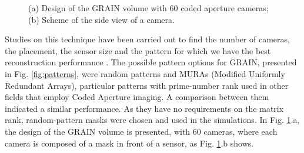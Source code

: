 \begin{figure}[ht]
    \centering
    \hfil    {}
    \caption{(a) Design of the GRAIN volume with 60 coded aperture cameras; (b) Scheme of the side view of a camera.}
    \label{fig:grainvol-sideview}
\end{figure}

Studies on this technique have been carried out to find the number of cameras, the placement, the sensor size and the pattern for which we have the best reconstruction performance \cite{tesi-cicero}. The possible pattern options for GRAIN, presented in Fig. \ref{fig:patterns}, were random patterns and MURAs (Modified Uniformly Redundant Arrays), particular patterns with prime-number rank used in other fields that employ Coded Aperture imaging. A comparison between them indicated a similar performance. As they have no requirements on the matrix rank, random-pattern masks were chosen and used in the simulations. In Fig. \ref{fig:grainvol-sideview}.a, the design of the GRAIN volume is presented, with 60 cameras, where each camera is composed of a mask in front of a sensor, as Fig. \ref{fig:grainvol-sideview}.b shows. 




